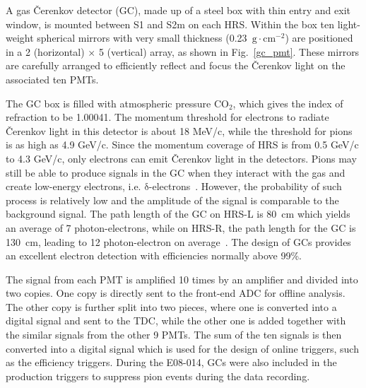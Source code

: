  A gas \v{C}erenkov detector (GC), made up of a steel box with thin entry and exit window, is mounted between S1 and S2m on each HRS. Within the box ten light-weight spherical mirrors with very small thickness (0.23~$\mathrm{g\cdot cm^{-2}}$) are positioned in a 2 (horizontal) $\times$ 5 (vertical) array, as shown in Fig.~\ref{gc_pmt}. These mirrors are carefully arranged to efficiently reflect and focus the \v{C}erenkov light on the associated ten PMTs.
 
 The GC box is filled with atmospheric pressure $\mathrm{CO_{2}}$, which gives the index of refraction to be 1.00041. The momentum threshold for electrons to radiate \v{C}erenkov light in this detector is about 18 MeV/c, while the threshold for pions is as high as 4.9 GeV/c. Since the momentum coverage of HRS is from 0.5 GeV/c to 4.3 GeV/c, only electrons can emit \v{C}erenkov light in the detectors. Pions may still be able to produce signals in the GC when they interact with the gas and create low-energy electrons, i.e. $\mathrm{\delta}$-electrons~\cite{pdg}. However, the probability of such process is relatively low and the amplitude of the signal is comparable to the background signal. The path length of the GC on HRS-L is 80~cm which yields an average of 7 photon-electrons, while on HRS-R, the path length for the GC is 130~cm, leading to 12 photon-electron on average~\cite{halla_nim}. The design of GCs provides an excellent electron detection with efficiencies normally above 99\%.

The signal from each PMT is amplified 10 times by an amplifier and divided into two copies. One copy is directly sent to the front-end ADC for offline analysis. The other copy is further split into two pieces, where one is converted into a digital signal and sent to the TDC, while the other one is added together with the similar signals from the other 9 PMTs. The sum of the ten signals is then converted into a digital signal which is used for the design of online triggers, such as the efficiency triggers. During the E08-014, GCs were also included in the production triggers to suppress pion events during the data recording.

